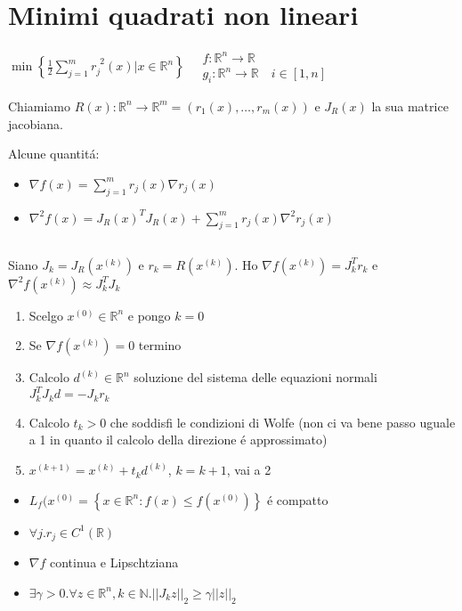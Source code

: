 \section{Minimi quadrati non lineari}
$ \min \left\lbrace \frac{1}{2} \sum_{j=1}^{m}r_j^{\phantom{j}2}(x) | x \in \mathbb{R}^n \right\rbrace  \quad  \begin{array}{l}
f: \mathbb{R}^n \rightarrow \mathbb{R} \\
g_i: \mathbb{R}^n \rightarrow \mathbb{R} \quad i \in [1,n]
\end{array} $

Chiamiamo $ R(x): \mathbb{R}^n \rightarrow \mathbb{R}^m = (r_1(x), \ldots, r_m(x)) $ e $ J_R(x) $ la sua matrice jacobiana.

Alcune quantit\'a:
\begin{itemize}
\item $ \nabla f(x) = \sum_{j = 1}^{m}r_j(x) \nabla r_j(x) $
\item $ \nabla^2 f(x) = J_R(x)^T J_R(x) + \sum_{j = 1}^{m}r_j(x) \nabla^2 r_j(x) $
\end{itemize}

\subsection{}
Siano $ J_k = J_R(x^{(k)}) $ e $ r_k = R(x^{(k)}) $. Ho $ \nabla f(x^{(k)}) = J_k^T r_k $ e $ \nabla^2 f(x^{(k)}) \approx J_k^T J_k $

\askip

\begin{proc}
\begin{enumerate}
\item Scelgo $ x^{(0)} \in \mathbb{R}^n $ e pongo $ k = 0 $
\item Se $ \nabla f(x^{(k)}) = 0 $ termino
\item Calcolo $ d^{(k)} \in \mathbb{R}^n $ soluzione del sistema delle equazioni normali $ J_k^T J_k d = - J_k r_k $
\item Calcolo $ t_k > 0 $ che soddisfi le condizioni di Wolfe (non ci va bene passo uguale a 1 in quanto il calcolo della direzione \'e approssimato)
\item $ x^{(k+1)} = x^{(k)} + t_k d^{(k)} $, $ k = k+1 $, vai a 2
\end{enumerate}
\end{proc}

\askip

\begin{itemize}
\item $ L_f(x^{(0)} = \left\lbrace x \in \mathbb{R}^n : f(x) \leq f(x^{(0)}) \right\rbrace $ \'e compatto
\item $ \forall j. r_j \in C^1(\mathbb{R}) $
\item $ \nabla f $ continua e Lipschtziana
\item $ \exists \gamma > 0. \forall z \in \mathbb{R}^n, k \in \mathbb{N}. || J_k z ||_2 \geq \gamma || z ||_2 $
\end{itemize}
